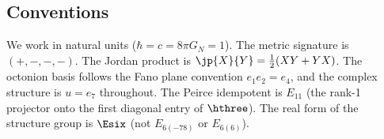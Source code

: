 \subsection{Conventions}

We work in natural units ($\hbar = c = 8\pi G_N = 1$). The metric
signature is $(+,-,-,-)$. The Jordan product is
$\jp{X}{Y} = \tfrac{1}{2}(XY + YX)$. The octonion basis follows the
Fano plane convention $e_1 e_2 = e_4$, and the complex structure is
$u = e_7$ throughout. The Peirce idempotent is $E_{11}$
(the rank-1 projector onto the first diagonal entry of $\hthree$).
The real form of the structure group is $\Esix$ (not $E_{6(-78)}$ or
$E_{6(6)}$).
